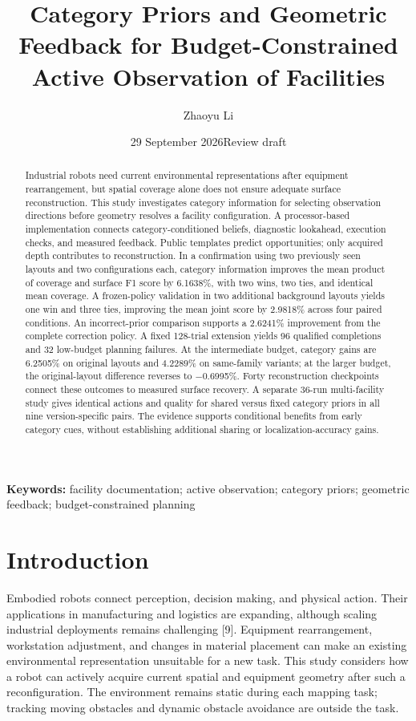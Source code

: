 \documentclass[11pt,a4paper]{article}
\title{\textbf{Category Priors and Geometric Feedback for Budget-Constrained Active Observation of Facilities}}
\author{Zhaoyu Li}
\date{29 September 2026\quad Review draft}
\begin{document}
\maketitle
\begin{abstract}
Industrial robots need current environmental representations after equipment rearrangement, but spatial coverage alone does not ensure adequate surface reconstruction. This study investigates category information for selecting observation directions before geometry resolves a facility configuration. A processor-based implementation connects category-conditioned beliefs, diagnostic lookahead, execution checks, and measured feedback. Public templates predict opportunities; only acquired depth contributes to reconstruction. In a confirmation using two previously seen layouts and two configurations each, category information improves the mean product of coverage and surface F1 score by 6.1638\%, with two wins, two ties, and identical mean coverage. A frozen-policy validation in two additional background layouts yields one win and three ties, improving the mean joint score by 2.9818\% across four paired conditions. An incorrect-prior comparison supports a 2.6241\% improvement from the complete correction policy. A fixed 128-trial extension yields 96 qualified completions and 32 low-budget planning failures. At the intermediate budget, category gains are 6.2505\% on original layouts and 4.2289\% on same-family variants; at the larger budget, the original-layout difference reverses to −0.6995\%. Forty reconstruction checkpoints connect these outcomes to measured surface recovery. A separate 36-run multi-facility study gives identical actions and quality for shared versus fixed category priors in all nine version-specific pairs. The evidence supports conditional benefits from early category cues, without establishing additional sharing or localization-accuracy gains.
\end{abstract}
\noindent\textbf{Keywords:} facility documentation; active observation; category priors; geometric feedback; budget-constrained planning

\hypertarget{introduction}{%
\section{Introduction}\label{introduction}}

Embodied robots connect perception, decision making, and physical action. Their applications in manufacturing and logistics are expanding, although scaling industrial deployments remains challenging {[}9{]}. Equipment rearrangement, workstation adjustment, and changes in material placement can make an existing environmental representation unsuitable for a new task. This study considers how a robot can actively acquire current spatial and equipment geometry after such a reconfiguration. The environment remains static during each mapping task; tracking moving obstacles and dynamic obstacle avoidance are outside the task.
\end{document}

